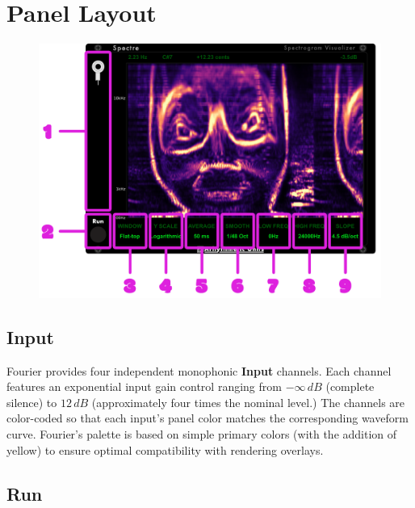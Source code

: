 \documentclass[12pt,letter]{article}
\begin{document}

\clearpage
\section{Panel Layout}


\begin{figure}[!htp]
\centering
\includegraphics[width=\textwidth]{img/PanelLayout}
\end{figure}

\subsection{Input}

Fourier provides four independent monophonic \textbf{Input} channels. Each
channel features an exponential input gain control ranging from $-\infty\,dB$
(complete silence) to $12\,dB$ (approximately four times the nominal level.)
The channels are color-coded so that each input's panel color matches the
corresponding waveform curve. Fourier’s palette is based on simple primary
colors (with the addition of yellow) to ensure optimal compatibility with
rendering overlays.

\subsection{Run}
\end{document}
